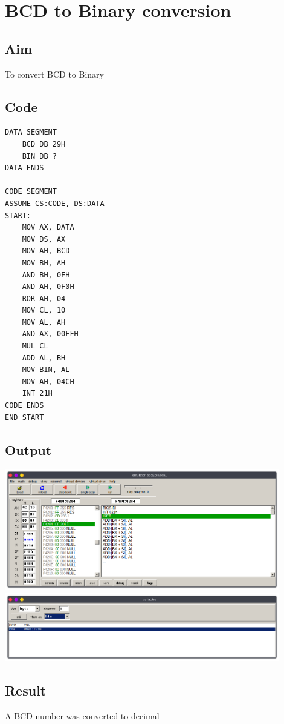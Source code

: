 \section{BCD to Binary conversion}
\subsection{Aim}
To convert BCD to Binary

\subsection{Code}
\begin{lstlisting}
DATA SEGMENT
    BCD DB 29H
    BIN DB ?
DATA ENDS

CODE SEGMENT
ASSUME CS:CODE, DS:DATA
START:
    MOV AX, DATA                   
    MOV DS, AX
    MOV AH, BCD
    MOV BH, AH
    AND BH, 0FH
    AND AH, 0F0H
    ROR AH, 04
    MOV CL, 10
    MOV AL, AH
    AND AX, 00FFH
    MUL CL
    ADD AL, BH
    MOV BIN, AL
    MOV AH, 04CH
    INT 21H
CODE ENDS
END START
\end{lstlisting}

\subsection{Output}
\begin{center}
	\includegraphics[width=0.90\textwidth]{img/p13/ss1.png}
	\includegraphics[width=0.90\textwidth]{img/p13/ss2.png}
\end{center}

\subsection{Result}
A BCD number was converted to decimal